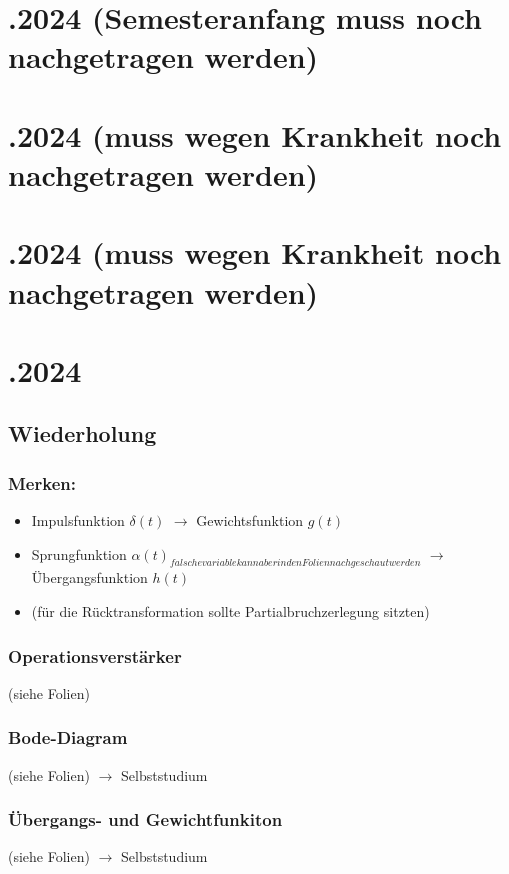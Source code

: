 \documentclass[a4paper, twoside, 11pt]{article}
\begin{document}
\section*{.2024 (Semesteranfang muss noch nachgetragen werden)}


\newpage
\section*{.2024 (muss wegen Krankheit noch nachgetragen werden)}
\section*{.2024 (muss wegen Krankheit noch nachgetragen werden)}

\newpage
\section*{.2024}
\subsection*{Wiederholung}
\subsubsection*{Merken:}
\begin{itemize}
	\item Impulsfunktion $\delta (t)$ $\rightarrow$ Gewichtsfunktion $g(t)$
	\item Sprungfunktion $\alpha (t) _{falsche variable kann aber in den Folien nachgeschaut werden}$ $\rightarrow$ Übergangsfunktion $h(t)$
	\item (für die Rücktransformation sollte Partialbruchzerlegung sitzten)
\end{itemize}

\subsubsection*{Operationsverstärker}
(siehe Folien)

\subsubsection*{Bode-Diagram}
(siehe Folien) $\rightarrow$ Selbststudium

\subsubsection*{Übergangs- und Gewichtfunkiton}
(siehe Folien) $\rightarrow$ Selbststudium
\end{document}
